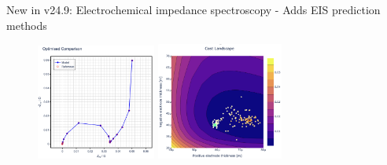 \documentclass[aspectratio=169]{beamer}
\begin{document}
\begin{frame}[fragile,t]{New in v24.9: Electrochemical impedance spectroscopy}
    \vspace{-6mm}
         - Adds EIS prediction methods

    \begin{figure}
        \centering
        \includegraphics[width=0.35\textwidth]{Images/Highlights/nyquist-eis-identification.png}
        \hspace{3em}
        \includegraphics[width=0.37\textwidth]{Images/Highlights/eis-identification-landscape.png}
        \label{fig:WeppnerHuggins}
    \end{figure}
\end{frame}
\end{document}
